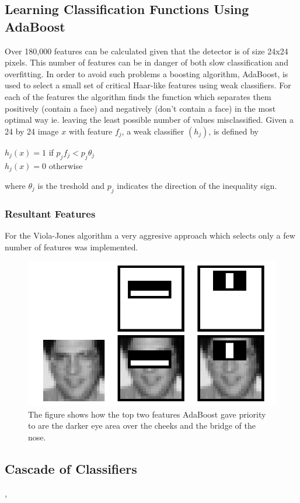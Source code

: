 \documentclass[12pt, letterpaper]{article}
\begin{document}
        \subsection{Learning Classification Functions Using AdaBoost}
            Over 180,000 features can be calculated given that
            the detector is of size 24x24 pixels. This number of
            features can be in danger of both slow classification
            and overfitting. In order to avoid such problems 
            a boosting algorithm, AdaBoost, is used to select a small
            set of critical Haar-like features using weak classifiers.
            For each of the features the algorithm finds the function which separates
            them positively (contain a face) and negatively (don’t
            contain a face) in the most optimal way ie. leaving the
            least possible number of values misclassified. Given a
            24 by 24 image \(x\) with feature \(f_j\), a weak classifier \((h_j)\), is 
            defined by 
            
            \begin{center}
                \(h_j(x)=1\) if \(p_j f_j < p_j\theta_j\) \\
                \(h_j(x)=0\) otherwise
            \end{center}
            where \(\theta_j\) is the treshold and \(p_j\) indicates
            the direction of the inequality sign.
            
            \subsubsection{Resultant Features}

                For the Viola-Jones algorithm a very aggresive
                approach which selects only a few number of features
                was implemented. 


                \begin{figure}[H]
                    \includegraphics[scale=0.3]{selectedFeatures.png}
                    \centering
                    \caption{The figure shows how the top two features AdaBoost
                    gave priority to are the darker eye area over the
                    cheeks and the bridge of the nose.}
                \end{figure}

        \subsection{Cascade of Classifiers}
        ,

                
\end{document}
